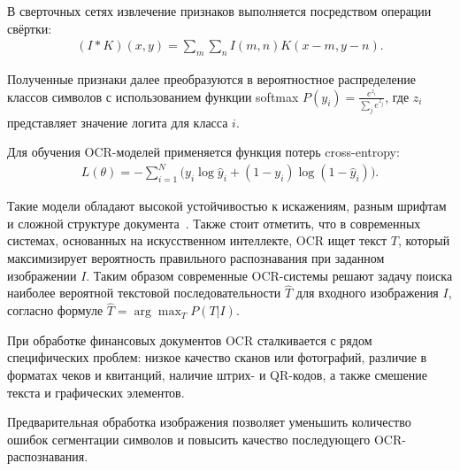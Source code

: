 \documentclass[14pt,a4paper]{extarticle}
\newenvironment{my_statement}[1][Утверждение]
{\par\indent\noindent{#1.} \normalfont}
{\par}
\begin{document}
В сверточных сетях извлечение признаков выполняется посредством операции свёртки:
\begin{gather*}
(I*K)(x,y)=
\sum_m \sum_n I(m,n)K(x-m,y-n).
\label{eq:convolution}
\end{gather*}

Полученные признаки далее преобразуются в вероятностное распределение классов символов с использованием функции softmax $P(y_i)=
\frac{e^{z_i}} {\sum_j e^{z_j}}$, где $z_i$ представляет значение логита для класса $i$.

Для обучения OCR-моделей применяется функция потерь cross-entropy:
\begin{gather*}
L(\theta)=
-\sum_{i=1}^{N}
\Big(
y_i \log \hat{y}_i
+
(1-y_i)\log(1-\hat{y}_i)
\Big).
\label{eq:loss}
\end{gather*}

Такие модели обладают высокой устойчивостью к искажениям, разным шрифтам и сложной структуре документа~\cite{nestorov2020}. Также стоит отметить, что в современных системах, основанных на искусственном интеллекте, OCR ищет текст $T$, который максимизирует вероятность правильного распознавания при заданном изображении $I$. Таким образом современные OCR-системы решают задачу поиска наиболее вероятной текстовой последовательности $\hat{T}$ для входного изображения $I$, согласно формуле
$\hat{T} = \arg\max_T P(T|I)$.

При обработке финансовых документов OCR сталкивается с рядом специфических проблем: низкое качество сканов или фотографий, различие в форматах чеков и квитанций, наличие штрих- и QR-кодов, а также смешение текста и графических элементов. 

\begin{my_statement}
Предварительная обработка изображения позволяет уменьшить
количество ошибок сегментации символов
и повысить качество последующего OCR-распознавания.
\end{my_statement}
\end{document}
